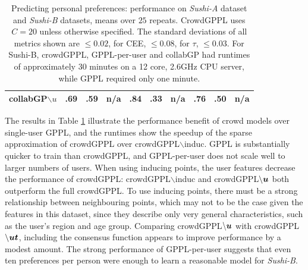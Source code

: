 \begin{table}
\begin{tabular}{l l l l@{\hskip 0.5cm} l l l@{\hskip 0.5cm} l l l}
\\
collabGP$\backslash u$ & .69 & .59 & n/a & .84 & .33 & n/a & .76 & .50 & n/a
\\
\bottomrule
\end{tabular}
\caption{Predicting personal preferences: performance on \emph{Sushi-A} dataset and \emph{Sushi-B} datasets,
means over $25$ repeats. 
CrowdGPPL uses $C=20$ unless otherwise specified.
The standard deviations of all metrics shown are $\leq 0.02$, for CEE, $\leq 0.08$, for $\tau$, $\leq 0.03$.
For Sushi-B, crowdGPPL, GPPL-per-user and collabGP had runtimes of approximately 30 minutes on a 12 core, 2.6GHz CPU server,
while GPPL required only one minute.
 }
\label{tab:sushi}
\end{table}
The results in Table \ref{tab:sushi} 
illustrate the performance benefit of crowd models over single-user GPPL, and
the runtimes 
show the speedup of the sparse approximation of crowdGPPL over crowdGPPL$\backslash$induc.
GPPL is substantially quicker to train than crowdGPPL, and GPPL-per-user does not scale well to larger numbers
of users.
 When using inducing points, the user features decrease the performance of crowdGPPL: 
 crowdGPPL$\backslash$induc
 and crowdGPPL$\backslash\boldsymbol u$ both outperform the full crowdGPPL. 
 To use inducing points,
 there must be a strong relationship between neighbouring points, which
 may not to be the case given the features in this dataset, since
 they describe only very general characteristics, such as the user's region and age group.
 Comparing crowdGPPL$\backslash\boldsymbol u$ with crowdGPPL$\backslash\boldsymbol u\boldsymbol t$, including the consensus function appears to improve performance by a modest amount.
 The strong performance of GPPL-per-user 
 suggests that even ten preferences per person were enough to learn a reasonable model for \emph{Sushi-B}.

